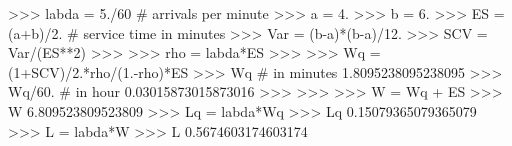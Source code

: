 
>>> labda = 5./60 # arrivals per minute
>>> a = 4.
>>> b = 6.
>>> ES = (a+b)/2.  # service time in minutes
>>> Var = (b-a)*(b-a)/12.
>>> SCV = Var/(ES**2)
>>>
>>> rho = labda*ES
>>>
>>> Wq = (1+SCV)/2.*rho/(1.-rho)*ES
>>> Wq # in minutes
1.8095238095238095
>>> Wq/60. # in hour
0.03015873015873016
>>>
>>>
>>> W = Wq + ES
>>> W
6.809523809523809
>>> Lq = labda*Wq
>>> Lq
0.15079365079365079
>>> L = labda*W
>>> L
0.5674603174603174

